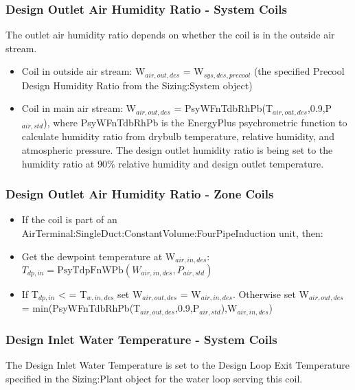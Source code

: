 \subsubsection{Design Outlet Air Humidity Ratio - System Coils}\label{design-outlet-air-humidity-ratio---system-coils}

The outlet air humidity ratio depends on whether the coil is in the outside air stream.

\begin{itemize}
\item
  Coil in outside air stream: W\(_{air,out,des}\) = W\(_{sys,des,precool}\) (the specified Precool Design Humidity Ratio from the Sizing:System object)
\item
  Coil in main air stream: W\(_{air,out,des}\) = PsyWFnTdbRhPb(T\(_{air,out,des}\),0.9,P\(_{air,std}\)), where PsyWFnTdbRhPb is the EnergyPlus psychrometric function to calculate humidity ratio from drybulb temperature, relative humidity, and atmospheric pressure. The design outlet humidity ratio is being set to the humidity ratio at 90\% relative humidity and design outlet temperature.
\end{itemize}

\subsubsection{Design Outlet Air Humidity Ratio - Zone Coils}\label{design-outlet-air-humidity-ratio---zone-coils}

\begin{itemize}
\tightlist
\item
  If the coil is part of an AirTerminal:SingleDuct:ConstantVolume:FourPipeInduction unit, then:
\item
  Get the dewpoint temperature at W$_{air,in,des}$: $T_{dp,in} = \text{PsyTdpFnWPb}\left(W_{air,in,des},P_{air,std}\right)$
\item
  If T$_{dp,in}$ < = T$_{w,in,des}$ set W$_{air,out,des}$ = W$_{air,in,des}$. Otherwise set W$_{air,out,des}$ = min(PsyWFnTdbRhPb(T$_{air,out,des}$,0.9,P$_{air,std}$),W$_{air,in,des}$)
\end{itemize}

\subsubsection{Design Inlet Water Temperature - System Coils}\label{design-inlet-water-temperature---system-coils}

The Design Inlet Water Temperature is set to the Design Loop Exit Temperature specified in the Sizing:Plant object for the water loop serving this coil.

